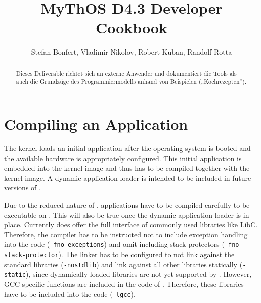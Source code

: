 

\title{MyThOS D4.3 Developer Cookbook}
\author{Stefan Bonfert, Vladimir Nikolov, Robert Kuban, Randolf Rotta}



\maketitle

\begin{abstract}
Dieses Deliverable richtet sich an externe Anwender und dokumentiert die Tools als auch die Grundzüge des Programmiermodells anhand von Beispielen („Kochrezepten“).
\end{abstract}

\newpage
\tableofcontents

\section{Compiling an Application}

The \mythos kernel loads an initial application after the operating system is booted and the available hardware is appropriately configured. This initial application is embedded into the kernel image and thus has to be compiled together with the kernel image. A dynamic application loader is intended to be included in future versions of \mythos.

Due to  the reduced nature of \mythos, applications have to be compiled carefully to be executable on \mythos. This will also be true once the dynamic application loader is in place. Currently \mythos does offer the full interface of commonly used libraries like LibC. Therefore, the compiler has to be instructed not to include exception handling into the code (\texttt{-fno-exceptions}) and omit including stack protectors (\texttt{-fno-stack-protector}). The linker has to be configured to not link against the standard libraries (\texttt{-nostdlib}) and link against all other libraries statically (\texttt{-static}), since dynamically loaded libraries are not yet supported by \mythos. However, GCC-specific functions are included in the code of \mythos. Therefore, these libraries have to be included into the code (\texttt{-lgcc}).

